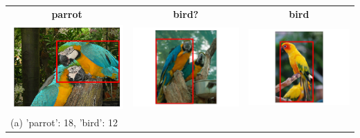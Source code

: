 \documentclass[11pt,a4paper]{article}
\begin{document}
\begin{table}[t]
\begin{tabularx}{\textwidth}{XXX}
\multicolumn{1}{c}{\textbf{parrot}} 
& \multicolumn{1}{c}{\textbf{bird?}} 
&\multicolumn{1}{c}{\textbf{bird}} \\
\includegraphics[width=0.6\columnwidth]{images/2371393_739660_seed_ambiguous.png}
& \includegraphics[width=0.6\columnwidth]{images/2356387_820983_singleton_obj.png}
& \includegraphics[width=0.6\columnwidth]{images/2341058_944671_singleton_obj.png}
\\
(a) 'parrot': 18, 'bird': 12

\end{tabularx}
\end{table}
\end{document}
